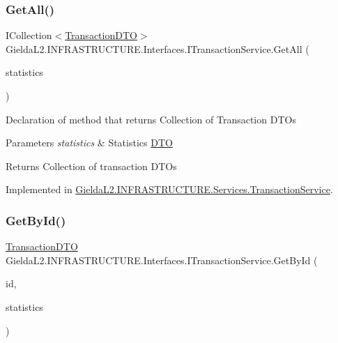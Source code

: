 \subsubsection{\texorpdfstring{GetAll()}{GetAll()}}
{\footnotesize\ttfamily I\+Collection$<$\mbox{\hyperlink{class_gielda_l2_1_1_i_n_f_r_a_s_t_r_u_c_t_u_r_e_1_1_d_t_o_1_1_transaction_d_t_o}{Transaction\+D\+TO}}$>$ Gielda\+L2.\+I\+N\+F\+R\+A\+S\+T\+R\+U\+C\+T\+U\+R\+E.\+Interfaces.\+I\+Transaction\+Service.\+Get\+All (\begin{DoxyParamCaption}\item[{\mbox{\hyperlink{class_gielda_l2_1_1_i_n_f_r_a_s_t_r_u_c_t_u_r_e_1_1_d_t_o_1_1_statistics_d_t_o}{Statistics\+D\+TO}}}]{statistics }\end{DoxyParamCaption})}



Declaration of method that returns Collection of Transaction D\+T\+Os 


\begin{DoxyParams}{Parameters}
{\em statistics} & Statistics \mbox{\hyperlink{namespace_gielda_l2_1_1_i_n_f_r_a_s_t_r_u_c_t_u_r_e_1_1_d_t_o}{D\+TO}}\\
\hline
\end{DoxyParams}
\begin{DoxyReturn}{Returns}
Collection of transaction D\+T\+Os
\end{DoxyReturn}


Implemented in \mbox{\hyperlink{class_gielda_l2_1_1_i_n_f_r_a_s_t_r_u_c_t_u_r_e_1_1_services_1_1_transaction_service_aafc6e900676de86277093074c80f4702}{Gielda\+L2.\+I\+N\+F\+R\+A\+S\+T\+R\+U\+C\+T\+U\+R\+E.\+Services.\+Transaction\+Service}}.

\mbox{\label{interface_gielda_l2_1_1_i_n_f_r_a_s_t_r_u_c_t_u_r_e_1_1_interfaces_1_1_i_transaction_service_a3cb57e9f3d8b0bde5fc57b75929ec2f5}} 
\subsubsection{\texorpdfstring{GetById()}{GetById()}}
{\footnotesize\ttfamily \mbox{\hyperlink{class_gielda_l2_1_1_i_n_f_r_a_s_t_r_u_c_t_u_r_e_1_1_d_t_o_1_1_transaction_d_t_o}{Transaction\+D\+TO}} Gielda\+L2.\+I\+N\+F\+R\+A\+S\+T\+R\+U\+C\+T\+U\+R\+E.\+Interfaces.\+I\+Transaction\+Service.\+Get\+By\+Id (\begin{DoxyParamCaption}\item[{int}]{id,  }\item[{\mbox{\hyperlink{class_gielda_l2_1_1_i_n_f_r_a_s_t_r_u_c_t_u_r_e_1_1_d_t_o_1_1_statistics_d_t_o}{Statistics\+D\+TO}}}]{statistics }\end{DoxyParamCaption})}



